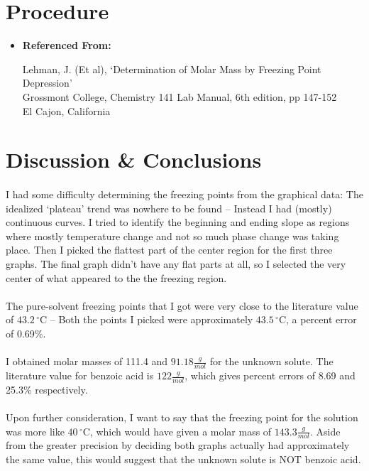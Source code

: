 \documentclass[fleqn,titlepage]{article}
\begin{document}
\section*{Procedure}
\begin{itemize}
  \item  \textbf{Referenced From:} \\
    \begin{addmargin}[1em]{1em}
      Lehman, J. (Et al), `Determination of Molar Mass by Freezing Point Depression' \\
      Grossmont College, Chemistry 141 Lab Manual, 6th edition, pp 147-152 \\
      El Cajon, California
    \end{addmargin}
\end{itemize}

\newpage
\section*{Discussion \& Conclusions}
\paragraph{} I had some difficulty determining the freezing points from the graphical data: The idealized `plateau' trend was nowhere to be found -- Instead I had (mostly) continuous curves. I tried to identify the beginning and ending slope as regions where mostly temperature change and not so much phase change was taking place. Then I picked the flattest part of the center region for the first three graphs. The final graph didn't have any flat parts at all, so I selected the very center of what appeared to the the freezing region.
\paragraph{} The pure-solvent freezing points that I got were very close to the literature value of $43.2\,^{\circ}\mathrm{C}$ -- Both the points I picked were approximately $43.5\,^{\circ}\mathrm{C}$, a percent error of 0.69\%.
\paragraph{} I obtained molar masses of 111.4 and $91.18\frac{g}{mol}$ for the unknown solute. The literature value for benzoic acid is $122\frac{g}{mol}$, which gives percent errors of 8.69 and 25.3\% respectively.
\paragraph{} Upon further consideration, I want to say that the freezing point for the solution was more like $40\,^{\circ}\mathrm{C}$, which would have given a molar mass of $143.3\frac{g}{mol}$. Aside from the greater precision by deciding both graphs actually had approximately the same value, this would suggest that the unknown solute is NOT benzoic acid.
\end{document}
